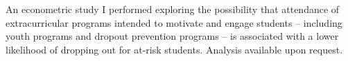 \documentclass[]{deedy-resume-openfont}
\begin{document}
\begin{minipage}[t]{0.66\textwidth}
\begin{tightemize}
\item An econometric study I performed exploring the possibility that attendance of extracurricular programs intended to motivate and engage students – including youth programs and dropout prevention programs – is associated with a lower likelihood of dropping out for at-risk students. Analysis available upon request.
\end{tightemize}

\end{minipage} 
\end{document}
